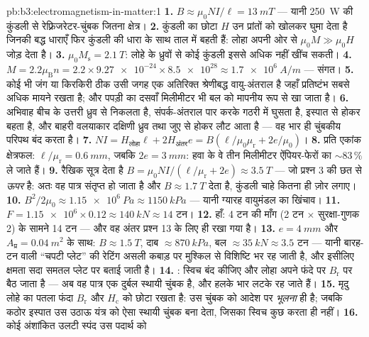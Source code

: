 \begin{solution}{pb:b3:electromagnetism-in-matter:1}
\textbf{1.} $B \approx \mu_0NI/\ell = \qty{13}{mT}$ --- यानी
\qty{250}{W} की कुंडली से रेफ़्रिजरेटर-चुंबक जितना क्षेत्र।
\textbf{2.} कुंडली का छोटा $H$ उन प्रांतों को खोलकर घुमा देता है
जिनकी बद्ध धाराएँ फिर कुंडली की धारा के साथ ताल में बहती हैं: लोहा
अपनी ओर से $\mu_0M \gg \mu_0H$ जोड़ देता है।
\textbf{3.} $\mu_0M_{\text{s}} = \qty{2.1}{T}$: लोहे के ध्रुवों से
कोई कुंडली इससे अधिक नहीं खींच सकती।
\textbf{4.} $M = 2.2\mu_{\text{B}}n = 2.2\times\num{9.27e-24}
\times\num{8.5e28} \approx \qty{1.7e6}{A/m}$ --- संगत।
\textbf{5.} कोई भी जंग या किरकिरी ठीक उसी जगह एक अतिरिक्त श्रेणीबद्ध
वायु-अंतराल है जहाँ प्रतिष्टंभ सबसे अधिक मायने रखता है; और पपड़ी का
दसवाँ मिलीमीटर भी बल को मापनीय रूप से खा जाता है।
\textbf{6.} अभिवाह बीच के उत्तरी ध्रुव से निकलता है, संपर्क-अंतराल
पार करके गठरी में घुसता है, इस्पात से होकर बहता है, और बाहरी वलयाकार
दक्षिणी ध्रुव तथा जुए से होकर लौट आता है --- वह भार ही
चुंबकीय परिपथ बंद करता है।
\textbf{7.} $NI = H_{\text{लोहा}}\ell + 2H_{\text{अंतर}}e =
B(\ell/\mu_0\mu_{\text{r}} + 2e/\mu_0)$।
\textbf{8.} प्रति एकांक क्षेत्रफल: $\ell/\mu_{\text{r}} = \qty{0.6}{mm}$,
जबकि $2e = \qty{3}{mm}$: हवा के वे तीन मिलीमीटर
ऐंपियर-फेरों का $\sim83\,\%$ ले जाते हैं।
\textbf{9.} रैखिक सूत्र देता है $B = \mu_0NI/(\ell/
\mu_{\text{r}} + 2e) \approx \qty{3.5}{T}$ --- जो प्रश्न 3 की छत से
\emph{ऊपर} है: अतः वह पात्र संतृप्त हो जाता है और $B \approx
\qty{1.7}{T}$ देता है, कुंडली चाहे कितना ही ज़ोर लगाए।
\textbf{10.} $B^2/2\mu_0 \approx \qty{1.15e6}{Pa} \approx
\qty{1150}{kPa}$ --- यानी ग्यारह वायुमंडल का खिंचाव।
\textbf{11.} $F = \num{1.15e6}\times0.12 \approx \qty{140}{kN}
\approx 14$ टन।
\textbf{12.} हाँ: 4 टन की माँग (2 टन $\times$ सुरक्षा-गुणक 2) के
सामने 14 टन --- और वह अंतर प्रश्न 13 के लिए ही रखा गया है।
\textbf{13.} $e = \qty{4}{mm}$ और $A_{\text{प्र}} =
\qty{0.04}{m^2}$ के साथ: $B \approx \qty{1.5}{T}$, दाब
$\approx\qty{870}{kPa}$, बल $\approx\qty{35}{kN} \approx 3.5$
टन --- यानी बारह-टन वाली ``चपटी प्लेट'' की रेटिंग असली कबाड़ पर
मुश्किल से विशिष्टि भर रह जाती है, और इसीलिए क्षमता सदा समतल प्लेट
पर बताई जाती है।
\textbf{14.} : स्विच बंद कीजिए और लोहा अपने फंदे पर
$B_{\text{r}}$ पर बैठ जाता है --- अब वह पात्र एक दुर्बल स्थायी
चुंबक है, और हलके भार लटके रह जाते हैं।
\textbf{15.} मृदु लोहे का पतला फंदा $B_{\text{r}}$ और
$H_{\text{c}}$ को छोटा रखता है: उस चुंबक को आदेश पर \emph{भूलना} ही
है; जबकि कठोर इस्पात उस उठाऊ यंत्र को ऐसा स्थायी चुंबक बना देता,
जिसका स्विच कुछ करता ही नहीं।
\textbf{16.} कोई अंशांकित उलटी स्पंद उस पदार्थ को

\end{solution}
